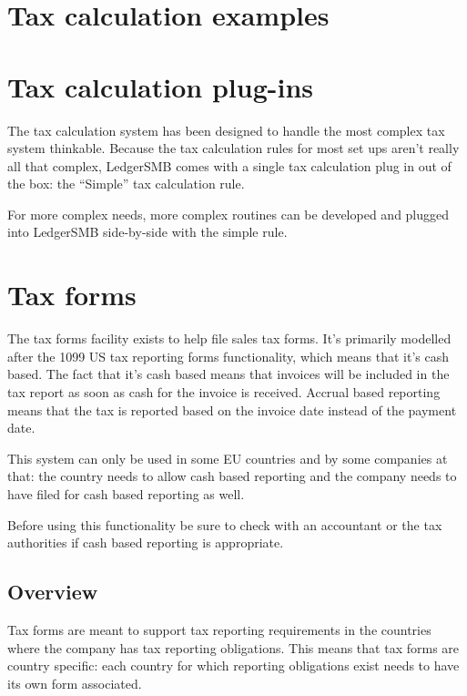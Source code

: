 \section{Tax calculation examples}
\label{sec-tax-calculation-examples}


\section{Tax calculation plug-ins}
\label{sec-tax-rule-plugins}

The tax calculation system has been designed to handle the most complex tax system
thinkable. Because the tax calculation rules for most set ups aren't really all that
complex, LedgerSMB comes with a single tax calculation plug in out of the box: the
``Simple'' tax calculation rule.

For more complex needs, more complex routines can be developed and plugged into
LedgerSMB side-by-side with the simple rule.


\section{Tax forms}
\label{sec-tax-taxforms}

The tax forms facility exists to help file sales tax forms. It's primarily modelled
after the 1099 US tax reporting forms functionality, which means that it's cash based.
The fact that it's cash based means that invoices will be included in the tax report
as soon as cash for the invoice is received. Accrual based reporting means that the
tax is reported based on the invoice date instead of the payment date.

This system can only be used in some EU countries and by some companies at that: the
country needs to allow cash based reporting and the company needs to have filed
for cash based reporting as well.

Before using this functionality be sure to check with an accountant or the tax
authorities if cash based reporting is appropriate.

\subsection{Overview}
\label{subsec-tax-taxforms-overview}

Tax forms are meant to support tax reporting requirements in the countries
where the company has tax reporting obligations. This means that tax forms
are country specific: each country for which reporting obligations exist
needs to have its own form associated.


